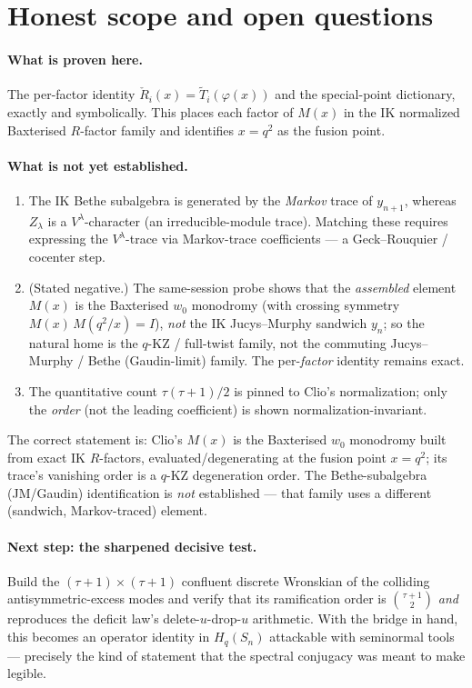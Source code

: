 \documentclass{article}
\theoremstyle{remark}
\newcommand{\Rcheck}{\check{R}}
\newcommand{\Ttilde}{\widetilde{T}}
\begin{document}
\section{Honest scope and open questions}

\paragraph{What is proven here.}
The per-factor identity $\Rcheck_i(x) = \Ttilde_i(\varphi(x))$ and the special-point dictionary, exactly and symbolically. This places each factor of $M(x)$ in the IK normalized Baxterised $R$-factor family and identifies $x = q^2$ as the fusion point.

\paragraph{What is not yet established.}
\begin{enumerate}
  \item[(a)] The IK Bethe subalgebra is generated by the \emph{Markov} trace of $y_{n+1}$, whereas $Z_\lambda$ is a $V^\lambda$-character (an irreducible-module trace). Matching these requires expressing the $V^\lambda$-trace via Markov-trace coefficients --- a Geck--Rouquier / cocenter step.
  \item[(b)] (Stated negative.) The same-session probe shows that the \emph{assembled} element $M(x)$ is the Baxterised $w_0$ monodromy (with crossing symmetry $M(x)\, M(q^2/x) = I$), \emph{not} the IK Jucys--Murphy sandwich $y_n$; so the natural home is the $q$-KZ / full-twist family, not the commuting Jucys--Murphy / Bethe (Gaudin-limit) family. The per-\emph{factor} identity remains exact.
  \item[(c)] The quantitative count $\tau(\tau+1)/2$ is pinned to Clio's normalization; only the \emph{order} (not the leading coefficient) is shown normalization-invariant.
\end{enumerate}

The correct statement is: Clio's $M(x)$ is the Baxterised $w_0$ monodromy built from exact IK $R$-factors, evaluated/degenerating at the fusion point $x = q^2$; its trace's vanishing order is a $q$-KZ degeneration order. The Bethe-subalgebra (JM/Gaudin) identification is \emph{not} established --- that family uses a different (sandwich, Markov-traced) element.

\paragraph{Next step: the sharpened decisive test.}
Build the $(\tau+1) \times (\tau+1)$ confluent discrete Wronskian of the colliding antisymmetric-excess modes and verify that its ramification order is $\binom{\tau+1}{2}$ \emph{and} reproduces the deficit law's delete-$u$-drop-$u$ arithmetic. With the bridge in hand, this becomes an operator identity in $H_q(S_n)$ attackable with seminormal tools --- precisely the kind of statement that the spectral conjugacy was meant to make legible.
\end{document}
